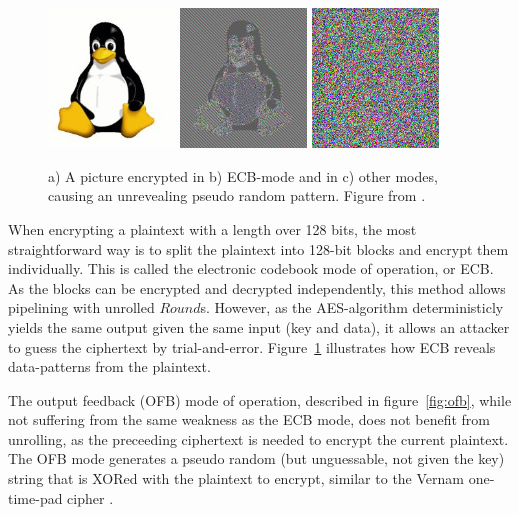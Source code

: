 \begin{figure}[htbb]
  \subfigure{\label{fig:ecbpicta}}
  \includegraphics[width=0.3\textwidth]{tux.jpeg}
  \subfigure{\label{fig:ecbpictb}}
  \includegraphics[width=0.3\textwidth]{tux_ecb.jpeg}
  \subfigure{\label{fig:ecbpictc}}
  \includegraphics[width=0.3\textwidth]{noise.png}
  \caption{a) A picture encrypted in b) ECB-mode and in c) other
    modes, causing an unrevealing pseudo random pattern. Figure from \cite{pingu}.}
  \label{fig:ecbpict}
\end{figure}

When encrypting a plaintext with a length over 128 bits, the most
straightforward way is to split the plaintext into 128-bit blocks and
encrypt them individually. This is called the electronic codebook mode
of operation, or ECB. As the blocks can be encrypted and decrypted
independently, this method allows pipelining with unrolled
$Round$s. However, as the AES-algorithm deterministicly yields the
same output given the same input (key and data), it allows an attacker
to guess the ciphertext by trial-and-error. Figure~\ref{fig:ecbpict}
illustrates how ECB reveals data-patterns from the plaintext.

The output feedback (OFB) mode of operation, described in
figure~\ref{fig:ofb}, while not suffering from the same weakness as
the ECB mode, does not benefit from unrolling, as the preceeding
ciphertext is needed to encrypt the current plaintext. The OFB mode
generates a pseudo random (but unguessable, not given the key) string
that is XORed with the plaintext to encrypt, similar to the Vernam
one-time-pad cipher \cite{vernam}.

